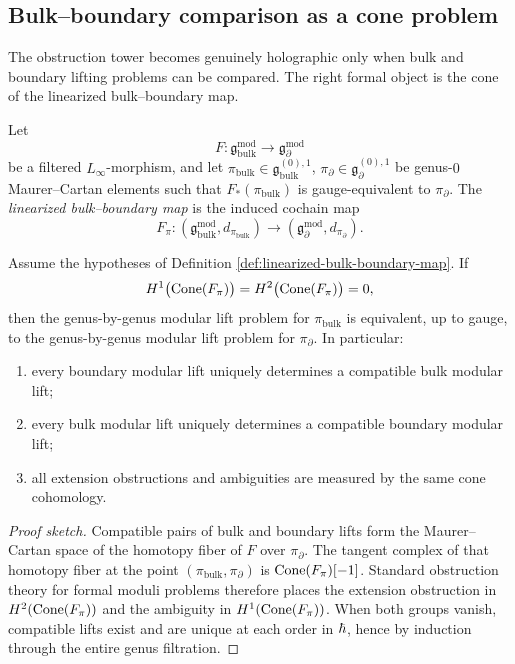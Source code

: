 \subsection{Bulk--boundary comparison as a cone problem}

The obstruction tower becomes genuinely holographic only when bulk and boundary lifting
problems can be compared. The right formal object is the cone of the linearized
bulk--boundary map.

\begin{definition}
Let
\[
F:\mathfrak g^{\mathrm{mod}}_{\mathrm{bulk}}\longrightarrow \mathfrak g^{\mathrm{mod}}_{\partial}
\]
be a filtered $L_\infty$-morphism, and let
$\pi_{\mathrm{bulk}}\in\mathfrak g_{\mathrm{bulk}}^{(0),1}$,
$\pi_\partial\in\mathfrak g_\partial^{(0),1}$
be genus-$0$ Maurer--Cartan elements such that $F_*(\pi_{\mathrm{bulk}})$ is gauge-equivalent to
$\pi_\partial$. The \emph{linearized bulk--boundary map} is the induced cochain map
\[
F_\pi:(\mathfrak g^{\mathrm{mod}}_{\mathrm{bulk}},d_{\pi_{\mathrm{bulk}}})
\longrightarrow
(\mathfrak g^{\mathrm{mod}}_{\partial},d_{\pi_\partial}).
\]
\end{definition}

\begin{theorem}
Assume the hypotheses of Definition \ref{def:linearized-bulk-boundary-map}. If
\[
H^1\bigl(\operatorname{Cone}(F_\pi)\bigr)=H^2\bigl(\operatorname{Cone}(F_\pi)\bigr)=0,
\]
then the genus-by-genus modular lift problem for $\pi_{\mathrm{bulk}}$ is equivalent, up to gauge,
to the genus-by-genus modular lift problem for $\pi_\partial$. In particular:
\begin{enumerate}[label=\textup{(\roman*)}]
\item every boundary modular lift uniquely determines a compatible bulk modular lift;
\item every bulk modular lift uniquely determines a compatible boundary modular lift;
\item all extension obstructions and ambiguities are measured by the same cone cohomology.
\end{enumerate}
\end{theorem}

\begin{proof}[Proof sketch]
Compatible pairs of bulk and boundary lifts form the Maurer--Cartan space of the homotopy
fiber of $F$ over $\pi_\partial$. The tangent complex of that homotopy fiber at the point
$(\pi_{\mathrm{bulk}},\pi_\partial)$ is $\operatorname{Cone}(F_\pi)[-1]$. Standard obstruction theory for formal
moduli problems therefore places the extension obstruction in
$H^2(\operatorname{Cone}(F_\pi))$ and the ambiguity in $H^1(\operatorname{Cone}(F_\pi))$. When both groups vanish,
compatible lifts exist and are unique at each order in $\hbar$, hence by induction through the
entire genus filtration.
\end{proof}

